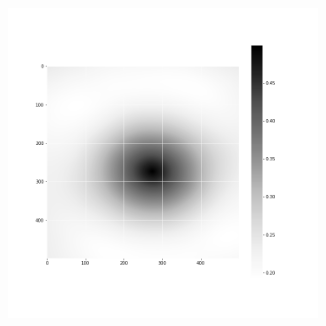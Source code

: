 \documentclass[12pt, a4paper]{report}
\begin{document}
\begin{figure}[H]
\begin{subfigure}{.32\textwidth}
  \label{img:microstrImg}
\end{subfigure}
\begin{subfigure}{.32\textwidth}
  \centering
  \includegraphics[width=0.9\textwidth]{Pictures/images9/iso_image_05_560.png}
  \label{img:microstrImg}
\end{subfigure}


\end{figure}
\end{document}
